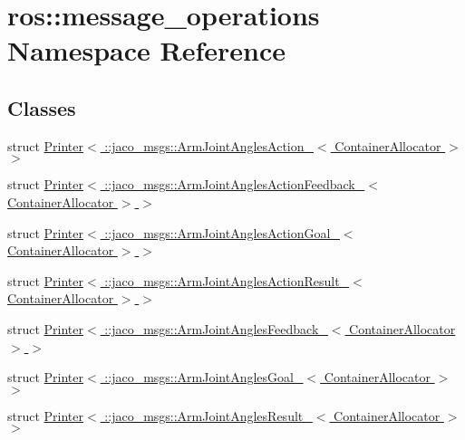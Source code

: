 \hypertarget{namespaceros_1_1message__operations}{}\section{ros\+:\+:message\+\_\+operations Namespace Reference}
\label{namespaceros_1_1message__operations}
\subsection*{Classes}
\begin{DoxyCompactItemize}
\item 
struct \hyperlink{structros_1_1message__operations_1_1Printer_3_01_1_1jaco__msgs_1_1ArmJointAnglesAction___3_01ContainerAllocator_01_4_01_4}{Printer$<$ \+::jaco\+\_\+msgs\+::\+Arm\+Joint\+Angles\+Action\+\_\+$<$ Container\+Allocator $>$ $>$}
\item 
struct \hyperlink{structros_1_1message__operations_1_1Printer_3_01_1_1jaco__msgs_1_1ArmJointAnglesActionFeedback__786902009de7467387c5cc1d1cad3c62}{Printer$<$ \+::jaco\+\_\+msgs\+::\+Arm\+Joint\+Angles\+Action\+Feedback\+\_\+$<$ Container\+Allocator $>$ $>$}
\item 
struct \hyperlink{structros_1_1message__operations_1_1Printer_3_01_1_1jaco__msgs_1_1ArmJointAnglesActionGoal___3_01ContainerAllocator_01_4_01_4}{Printer$<$ \+::jaco\+\_\+msgs\+::\+Arm\+Joint\+Angles\+Action\+Goal\+\_\+$<$ Container\+Allocator $>$ $>$}
\item 
struct \hyperlink{structros_1_1message__operations_1_1Printer_3_01_1_1jaco__msgs_1_1ArmJointAnglesActionResult___3_01ContainerAllocator_01_4_01_4}{Printer$<$ \+::jaco\+\_\+msgs\+::\+Arm\+Joint\+Angles\+Action\+Result\+\_\+$<$ Container\+Allocator $>$ $>$}
\item 
struct \hyperlink{structros_1_1message__operations_1_1Printer_3_01_1_1jaco__msgs_1_1ArmJointAnglesFeedback___3_01ContainerAllocator_01_4_01_4}{Printer$<$ \+::jaco\+\_\+msgs\+::\+Arm\+Joint\+Angles\+Feedback\+\_\+$<$ Container\+Allocator $>$ $>$}
\item 
struct \hyperlink{structros_1_1message__operations_1_1Printer_3_01_1_1jaco__msgs_1_1ArmJointAnglesGoal___3_01ContainerAllocator_01_4_01_4}{Printer$<$ \+::jaco\+\_\+msgs\+::\+Arm\+Joint\+Angles\+Goal\+\_\+$<$ Container\+Allocator $>$ $>$}
\item 
struct \hyperlink{structros_1_1message__operations_1_1Printer_3_01_1_1jaco__msgs_1_1ArmJointAnglesResult___3_01ContainerAllocator_01_4_01_4}{Printer$<$ \+::jaco\+\_\+msgs\+::\+Arm\+Joint\+Angles\+Result\+\_\+$<$ Container\+Allocator $>$ $>$}

\end{DoxyCompactItemize}
